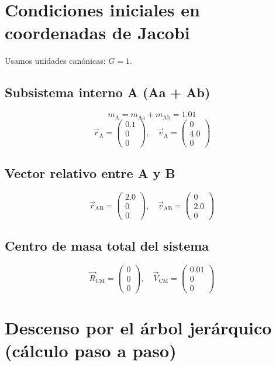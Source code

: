 \section{Condiciones iniciales en coordenadas de Jacobi}
Usamos unidades canónicas: \(G = 1\).

\subsection{Subsistema interno A (Aa + Ab)}
\[
m_{\text{A}} = m_{\text{Aa}} + m_{\text{Ab}} = 1.01
\]
\[
\vec{r}_{\text{A}} = \begin{pmatrix} 0.1 \\ 0 \\ 0 \end{pmatrix}, \quad
\vec{v}_{\text{A}} = \begin{pmatrix} 0 \\ 4.0 \\ 0 \end{pmatrix}
\]

\subsection{Vector relativo entre A y B}
\[
\vec{r}_{\text{AB}} = \begin{pmatrix} 2.0 \\ 0 \\ 0 \end{pmatrix}, \quad
\vec{v}_{\text{AB}} = \begin{pmatrix} 0 \\ 2.0 \\ 0 \end{pmatrix}
\]

\subsection{Centro de masa total del sistema}
\[
\vec{R}_{\text{CM}} = \begin{pmatrix} 0 \\ 0 \\ 0 \end{pmatrix}, \quad
\vec{V}_{\text{CM}} = \begin{pmatrix} 0.01 \\ 0 \\ 0 \end{pmatrix}
\]

\section{Descenso por el árbol jerárquico (cálculo paso a paso)}


